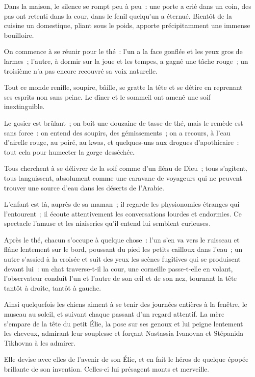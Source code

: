 \documentclass[french,twoside]{book} %
\begin{document}
\noindent Dans la maison, le silence se rompt peu à peu : une porte a crié dans un coin, des pas ont retenti dans la cour, dans le fenil quelqu’un a éternué. Bientôt de la cuisine un domestique, pliant sous le poids, apporte précipitamment une immense bouilloire.\par
On commence à se réunir pour le thé : l’un a la face gonflée et les yeux gros de larmes ; l’autre, à dormir sur la joue et les tempes, a gagné une tâche rouge ; un troisième n’a pas encore recouvré sa voix naturelle.\par
Tout ce monde renifle, soupire, bâille, se gratte la tête et se détire en reprenant ses esprits non sans peine. Le dîner et le sommeil ont amené une soif inextinguible.\par
Le gosier est brûlant ; on boit une douzaine de tasse de thé, mais le remède est sans force : on entend des soupirs, des gémissements ; on a recours, à l’eau d’airelle rouge, au poiré, au kwas, et quelques-uns aux drogues d’apothicaire : tout cela pour humecter la gorge desséchée.\par
Tous cherchent à se délivrer de la soif comme d’un fléau de Dieu ; tous s’agitent, tous languissent, absolument comme une caravane de voyageurs qui ne peuvent trouver une source d’eau dans les déserts de l’Arabie.\par
L’enfant est là, auprès de sa maman ; il regarde les physionomies étranges qui l’entourent ; il écoute attentivement les conversations lourdes et endormies. Ce spectacle l’amuse et les niaiseries qu’il entend lui semblent curieuses.\par
Après le thé, chacun s’occupe à quelque chose : l’un s’en va vers le ruisseau et flâne lentement sur le bord, poussant du pied les petits cailloux dans l’eau ; un autre s’assied à la croisée et suit des yeux les scènes fugitives qui se produisent devant lui : un chat traverse-t-il la cour, une corneille passe-t-elle en volant, l’observateur conduit l’un et l’autre de son œil et de son nez, tournant la tête tantôt à droite, tantôt à gauche.\par
Ainsi quelquefois les chiens aiment à se tenir des journées entières à la fenêtre, le museau au soleil, et suivant chaque passant d’un regard attentif. La mère s’empare de la tête du petit Élie, la pose sur ses genoux et lui peigne lentement les cheveux, admirant leur souplesse et forçant Nastassia Ivanovna et Stépanida Tikhovna à les admirer.\par
Elle devise avec elles de l’avenir de son Élie, et en fait le héros de quelque épopée brillante de son invention. Celles-ci lui présagent monts et merveille.\par
\end{document}
